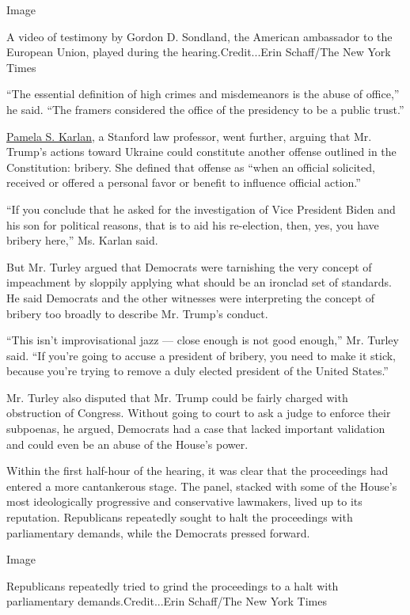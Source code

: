 Image

A video of testimony by Gordon D. Sondland, the American ambassador to
the European Union, played during the hearing.Credit...Erin Schaff/The
New York Times

``The essential definition of high crimes and misdemeanors is the abuse
of office,'' he said. ``The framers considered the office of the
presidency to be a public trust.''

\href{https://www.nytimes3xbfgragh.onion/2019/12/04/us/politics/pamela-karlan.html}{Pamela
S. Karlan}, a Stanford law professor, went further, arguing that Mr.
Trump's actions toward Ukraine could constitute another offense outlined
in the Constitution: bribery. She defined that offense as ``when an
official solicited, received or offered a personal favor or benefit to
influence official action.''

``If you conclude that he asked for the investigation of Vice President
Biden and his son for political reasons, that is to aid his re-election,
then, yes, you have bribery here,'' Ms. Karlan said.

But Mr. Turley argued that Democrats were tarnishing the very concept of
impeachment by sloppily applying what should be an ironclad set of
standards. He said Democrats and the other witnesses were interpreting
the concept of bribery too broadly to describe Mr. Trump's conduct.

``This isn't improvisational jazz --- close enough is not good enough,''
Mr. Turley said. ``If you're going to accuse a president of bribery, you
need to make it stick, because you're trying to remove a duly elected
president of the United States.''

Mr. Turley also disputed that Mr. Trump could be fairly charged with
obstruction of Congress. Without going to court to ask a judge to
enforce their subpoenas, he argued, Democrats had a case that lacked
important validation and could even be an abuse of the House's power.

Within the first half-hour of the hearing, it was clear that the
proceedings had entered a more cantankerous stage. The panel, stacked
with some of the House's most ideologically progressive and conservative
lawmakers, lived up to its reputation. Republicans repeatedly sought to
halt the proceedings with parliamentary demands, while the Democrats
pressed forward.

Image

Republicans repeatedly tried to grind the proceedings to a halt with
parliamentary demands.Credit...Erin Schaff/The New York Times

